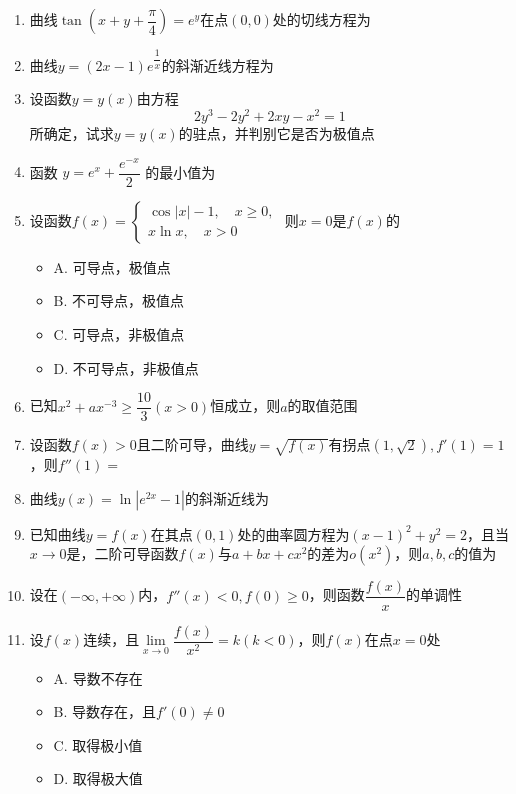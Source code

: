 \documentclass[./book.tex]{subfiles}
\begin{document}
    \begin{enumerate}
        \item 曲线$\tan(x + y + \dfrac{\pi}{4}) = e^y$在点$(0, 0)$处的切线方程为
        \item 曲线$y = (2x - 1)e^\dfrac{1}{x}$的斜渐近线方程为
        \item 设函数$y = y(x)$由方程
        \[
            2y^3 - 2y^2 + 2xy - x^2 = 1
        \]
        所确定，试求$y = y(x)$的驻点，并判别它是否为极值点
        \item 函数 $y = e^x + \dfrac{e^{-x}}{2}$ 的最小值为
        \item 设函数$f(x) = \begin{cases}
                                \cos|x| - 1, \quad x \geq 0, \\
                                x\ln x, \quad x > 0
        \end{cases}$ 则$x = 0$是$f(x)$的
        \begin{itemize}
            \item A. 可导点，极值点
            \item B. 不可导点，极值点
            \item C. 可导点，非极值点
            \item D. 不可导点，非极值点
        \end{itemize}
        \item 已知$x^2 + ax^{-3} \geq \dfrac{10}{3}(x > 0)$恒成立，则$a$的取值范围
        \item 设函数$f(x) > 0$且二阶可导，曲线$y = \sqrt{f(x)}$有拐点$(1, \sqrt{2}), f'(1) = 1$，则$f''(1) = $
        \item 曲线$y(x) = \ln|e^{2x} - 1|$的斜渐近线为
        \item 已知曲线$y = f(x)$在其点$(0, 1)$处的曲率圆方程为$(x - 1)^2 + y^2 = 2$，且当$x\to 0$是，二阶可导函数$f(x)$与$a + bx + cx^2$的差为$o(x^2)$，则$a, b, c$的值为
        \item 设在$(-\infty, +\infty)$内，$f''(x) < 0, f(0) \geq 0$，则函数$\dfrac{f(x)}{x}$的单调性
        \item 设$f(x)$连续，且$\lim\limits_{x\to 0}\dfrac{f(x)}{x^2} = k(k < 0)$，则$f(x)$在点$x = 0$处
        \begin{itemize}
            \item A. 导数不存在
            \item B. 导数存在，且$f'(0) \neq 0$
            \item C. 取得极小值
            \item D. 取得极大值

\end{itemize}
\end{enumerate}
\end{document}
